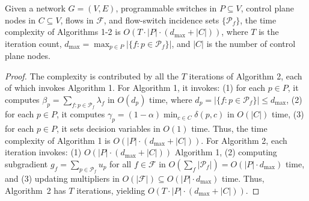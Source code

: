 \begin{theorem}
Given a network $G = (V, E)$, programmable switches in $P \subseteq V$, control plane nodes in $C \subseteq V$, flows in $\mathcal{F}$, and flow-switch incidence sets $\{\mathcal{P}_f\}$, the time complexity of Algorithms 1-2 is $O(T \cdot |P| \cdot (d_{\max} + |C|))$, where $T$ is the iteration count, $d_{\max} = \max_{p \in P} |\{f : p \in \mathcal{P}_f\}|$, and $|C|$ is the number of control plane nodes.
\end{theorem}

\begin{proof}
The complexity is contributed by all the $T$ iterations of Algorithm 2, each of which invokes Algorithm 1. For Algorithm 1, it invokes: (1) for each $p \in P$, it computes $\beta_p = \sum_{f: p \in \mathcal{P}_f} \lambda_f$ in $O(d_p)$ time, where $d_p = |\{f : p \in \mathcal{P}_f\}| \leq d_{\max}$, (2) for each $p \in P$, it computes $\gamma_p = (1-\alpha) \min_{c \in C} \delta(p,c)$ in $O(|C|)$ time, (3) for each $p \in P$, it sets decision variables in $O(1)$ time. Thus, the time complexity of Algorithm 1 is $O(|P| \cdot (d_{\max} + |C|))$. For Algorithm 2, each iteration invokes: (1) $O(|P| \cdot (d_{\max} + |C|))$ Algorithm 1, (2) computing subgradient $g_f = \sum_{p \in \mathcal{P}_f} u_p$ for all $f \in \mathcal{F}$ in $O\left(\sum_f |\mathcal{P}_f|\right) = O(|P| \cdot d_{\max})$ time, and (3) updating multipliers in $O(|\mathcal{F}|) \subseteq O(|P| \cdot d_{\max})$ time. Thus, Algorithm~2 has $T$ iterations, yielding $O(T \cdot |P| \cdot (d_{\max} + |C|))$.
\end{proof}




